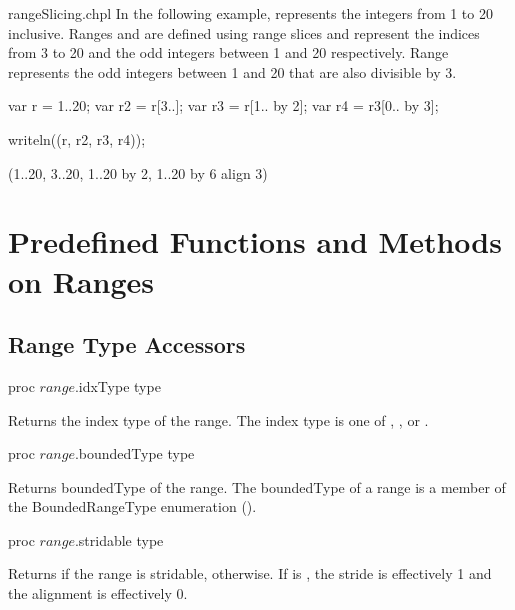 \begin{chapelexample}{rangeSlicing.chpl}
In the following example,  represents the integers from 1 to
20 inclusive.  Ranges  and  are defined using range
slices and represent the indices from 3 to 20 and the odd integers
between 1 and 20 respectively. Range  represents the odd
integers between 1 and 20 that are also divisible by 3.
\begin{chapel}
var r = 1..20;
var r2 = r[3..];
var r3 = r[1.. by 2];
var r4 = r3[0.. by 3];
\end{chapel}
\begin{chapelpost}
writeln((r, r2, r3, r4));
\end{chapelpost}
\begin{chapeloutput}
(1..20, 3..20, 1..20 by 2, 1..20 by 6 align 3)
\end{chapeloutput}
\end{chapelexample}

\section{Predefined Functions and Methods on Ranges}

\subsection{Range Type Accessors}

\begin{protohead}
proc $range$.idxType type
\end{protohead}
\begin{protobody}
Returns the index type of the range.  The index type is one
of , ,  or .
\end{protobody}

\begin{protohead}
proc $range$.boundedType type
\end{protohead}
\begin{protobody}
Returns boundedType of the range.  The boundedType of a range is a member of the
BoundedRangeType enumeration ().
\end{protobody}

\begin{protohead}
proc $range$.stridable type
\end{protohead}
\begin{protobody}
Returns  if the range is stridable,  otherwise.  If  is
, the stride is effectively 1 and the alignment is effectively 0.
\end{protobody}

